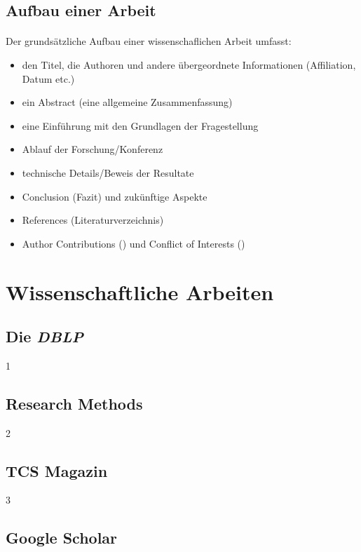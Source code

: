 \documentclass[10pt, a4paper]{article}
\begin{document}
\subsection{Aufbau einer Arbeit}
\paragraph{}
Der grundsätzliche Aufbau einer wissenschaflichen Arbeit umfasst:
\begin{itemize}
\item den Titel, die Authoren und andere übergeordnete Informationen (Affiliation, Datum etc.)
\item ein Abstract (eine allgemeine Zusammenfassung)
\item eine Einführung mit den Grundlagen der Fragestellung
\item Ablauf der Forschung/Konferenz
\item technische Details/Beweis der Resultate
\item Conclusion (Fazit) und zukünftige Aspekte
\item References (Literaturverzeichnis)
\item Author Contributions () und Conflict of Interests ()
\end{itemize}
\par

\paragraph{}



\section{Wissenschaftliche Arbeiten}
\subsection{Die \textit{DBLP}}
1

\subsection{Research Methods}
2

\subsection{TCS Magazin}
3

\subsection{Google Scholar}
\end{document}
